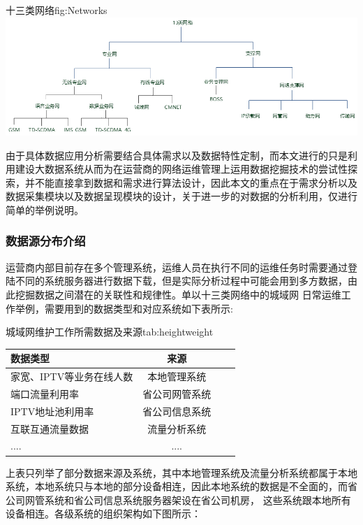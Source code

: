 \documentclass{HustGraduPaper}
\begin{document}
    \begin{generalfig}{十三类网络}{fig:Networks} 
        \includegraphics[width = \textwidth]{Figures/networks.png}
    \end{generalfig}

    由于具体数据应用分析需要结合具体需求以及数据特性定制，而本文进行的只是利用建设大数据系统从而为在运营商的网络运维管理上运用数据挖掘技术的尝试性探索，并不能直接拿到数据和需求进行算法设计，因此本文的重点在于需求分析以及
    数据采集模块以及数据呈现模块的设计，关于进一步的对数据的分析利用，仅进行简单的举例说明。
    \subsubsection{数据源分布介绍}
    运营商内部目前存在多个管理系统，运维人员在执行不同的运维任务时需要通过登陆不同的系统服务器进行数据下载，但是实际分析过程中可能会用到多方数据，由此挖掘数据之间潜在的关联性和规律性。单以十三类网络中的城域网
    日常运维工作举例，需要用到的数据类型和对应系统如下表所示:

    \begin{generaltab}{城域网维护工作所需数据及来源}{tab:heightweight}
		\begin{tabularx}{\textwidth}{lCCC}
			\toprule
			数据类型&来源\\
			\midrule
			家宽、IPTV等业务在线人数&本地管理系统\\
			端口流量利用率&省公司网管系统\\
			IPTV地址池利用率&省公司信息系统\\
			互联互通流量数据&流量分析系统\\
			.... & ....\\
			\bottomrule
		\end{tabularx}
    \end{generaltab}
     
    上表只列举了部分数据来源及系统，其中本地管理系统及流量分析系统都属于本地系统，本地系统只与本地的部分设备相连，因此本地系统的数据是不全面的，而省公司网管系统和省公司信息系统服务器架设在省公司机房，
    这些系统跟本地所有设备相连。各级系统的组织架构如下图所示：
\end{document}
